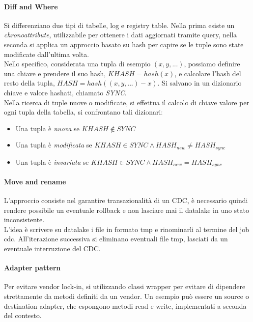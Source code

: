 \paragraph{Diff and Where}
Si differenziano due tipi di tabelle, log e registry table.
Nella prima esiste un \emph{chronoattribute}, utilizzabile per ottenere i dati aggiornati 
tramite query, nella seconda si applica un approccio basato su hash per capire 
se le tuple sono state modificate dall'ultima volta.\\
Nello specifico, considerata una tupla di esempio $(x,y,...)$, possiamo definire una chiave
e prendere il suo hash, $KHASH = hash(x)$, e calcolare l'hash del resto della tupla, 
$HASH = hash((x,y,...) - x)$. Si salvano in un dizionario chiave e valore hashati, chiamato
\emph{SYNC}.\\
Nella ricerca di tuple nuove o modificate, si effettua il calcolo di chiave valore 
per ogni tupla della tabella, si confrontano tali dizionari:
\begin{itemize}
    \item Una tupla è \emph{nuova} se $KHASH \notin SYNC$
    \item Una tupla è \emph{modificata} se $KHASH \in SYNC \wedge  HASH_{new} \neq HASH_{sync}$
    \item Una tupla è \emph{invariata} se $KHASH \in SYNC \wedge HASH_{new} = HASH_{sync}$
\end{itemize}


\paragraph{Move and rename}
L'approccio consiste nel garantire transazionalità di un CDC, 
è necessario quindi rendere possibile un eventuale rollback e non lasciare mai 
il datalake in uno stato inconsistente.\\
L'idea è scrivere su datalake i file in formato tmp e rinominarli al termine del job cdc.
All'iterazione successiva si eliminano eventuali file tmp, lasciati da un eventuale 
interruzione del CDC.

\paragraph{Adapter pattern}
Per evitare vendor lock-in, si utilizzando classi wrapper per evitare di dipendere
strettamente da metodi definiti da un vendor.
Un esempio può essere un source o destination adapter, che espongono metodi read e 
write, implementati a seconda del contesto.

